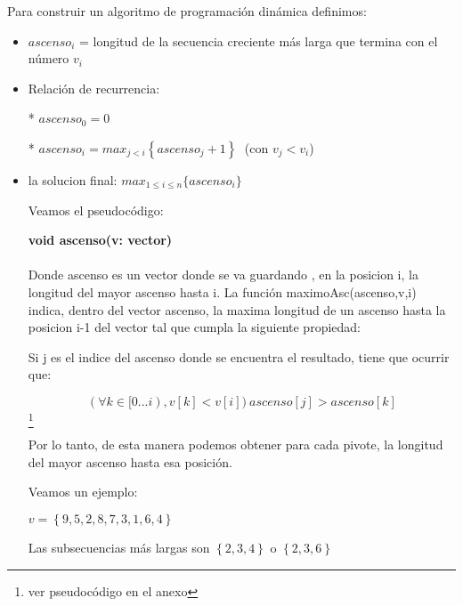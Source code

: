 Para construir un algoritmo de programación dinámica definimos:
\begin{itemize}
	
\item $ascenso_i$ = longitud de la secuencia creciente más larga que termina con el número $v_i$
	
\item Relación de recurrencia:	 
  
  * $ascenso_0 = 0$

  * $ascenso_i  = max_{j<i} \left\lbrace ascenso_j + 1\right\rbrace  \;      $ (con $ v_j < v_i  $)

	
\item la solucion final: $max_{1\leq i\leq n} \{ascenso_i\}$

Veamos el pseudocódigo:

\textbf{void ascenso(v: vector)}\\
	\begin{algorithm}[H]

  \end{algorithm}

	

\paragraph{}
Donde ascenso es un vector donde se va guardando , en la posicion i, la longitud del mayor ascenso hasta i. La función maximoAsc(ascenso,v,i) indica, dentro del vector ascenso, la maxima longitud de un ascenso hasta la posicion i-1 del vector tal que cumpla la siguiente propiedad:

\vspace*{1cm}

Si j es el indice del ascenso donde se encuentra el resultado, tiene que ocurrir que:

$$(\forall k \in [0...i) , v[k]<v[i]) \  ascenso[j] > ascenso[k]$$\footnote{ver pseudocódigo en el anexo}


Por lo tanto, de esta manera podemos obtener para cada pivote, la longitud del mayor ascenso hasta esa posición.

Veamos un ejemplo:

$v = \left\lbrace 9,5,2,8,7,3,1,6,4\right\rbrace$ 

Las subsecuencias más largas son $\left\lbrace 2,3,4\right\rbrace$ o $\left\lbrace 2,3,6\right\rbrace$




\end{itemize}



